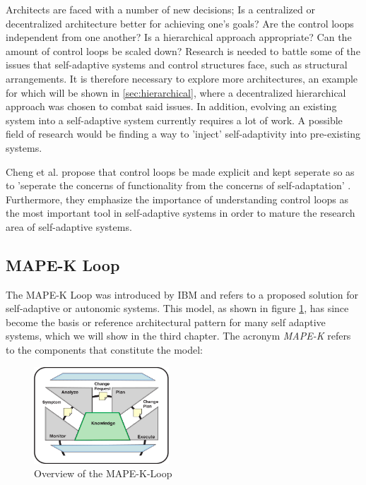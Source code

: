     
    \quad Architects are faced with a number of new decisions;
    Is a centralized or decentralized architecture better for achieving one's goals? Are the control loops independent from one another?
    Is a hierarchical approach appropriate? Can the amount of control loops be scaled down?
    Research is needed to battle some of the issues that self-adaptive systems and control structures face, such as structural arrangements. 
    It is therefore necessary to explore more architectures, an example for which will be shown in \ref{sec:hierarchical}, where a decentralized hierarchical approach was
    chosen to combat said issues. In addition, evolving an existing system into a self-adaptive system currently requires a lot of work. 
    A possible field of research would be finding a way to 'inject' self-adaptivity into pre-existing systems.
    
    \quad Cheng et al. propose that control loops be made explicit and kept seperate so as to 'seperate the concerns of functionality from the concerns of self-adaptation' \cite[p. 16]{Cheng:2009:SES:1573856.1573858}.
    Furthermore, they emphasize the importance of understanding control loops as the most important tool in self-adaptive systems in order to mature the research area of self-adaptive systems.
    
    \subsection{MAPE-K Loop}
    \label{sub:mape}
    The MAPE-K Loop was introduced by IBM \cite{Kephart:2003:VAC:642194.642200} and refers to a proposed solution for self-adaptive or autonomic systems.
    This model, as shown in figure \ref{fig:mape}, has since become the basis or reference architectural pattern for many self adaptive systems, which we will show in the third chapter.
    The acronym \textit{MAPE-K} refers to the components that constitute the model:
    \begin{figure}[hbt]
        \centering
        \includegraphics[width=0.45\textwidth]{Bilder/mape.png}
        \caption{
                Overview of the MAPE-K-Loop\cite{Kephart:2003:VAC:642194.642200}
        }
        \label{fig:mape}
    \end{figure}  

